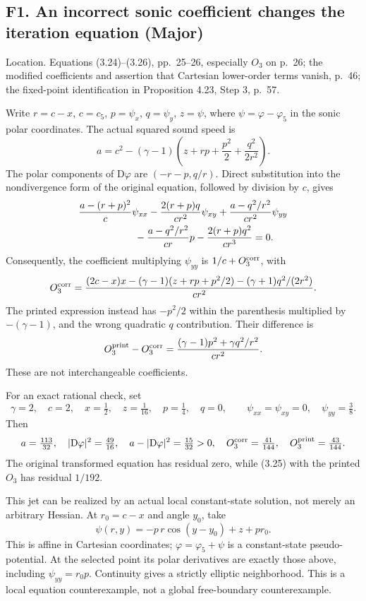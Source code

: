 \documentclass[10pt]{article}
\begin{document}
\subsection*{F1. An incorrect sonic coefficient changes the iteration equation (Major)}
Location. Equations (3.24)–(3.26), pp. 25–26, especially \(O_3\) on p. 26; the modified coefficients and assertion that Cartesian lower-order terms vanish, p. 46; the fixed-point identification in Proposition 4.23, Step 3, p. 57.\par
Write \(r=c-x\), \(c=c_5\), \(p=\psi_x\), \(q=\psi_y\), \(z=\psi\), where \(\psi=\varphi-\varphi_5\) in the sonic polar coordinates. The actual squared sound speed is \[a=c^2-(\gamma-1)
 \left(z+rp+\frac{p^2}{2}+\frac{q^2}{2r^2}\right).\] The polar components of \(\mathrm D\varphi\) are \((-r-p,q/r)\). Direct substitution into the nondivergence form of the original equation, followed by division by \(c\), gives \[\begin{aligned}
 &\frac{a-(r+p)^2}{c}\psi_{xx}
 -\frac{2(r+p)q}{cr^2}\psi_{xy}
 +\frac{a-q^2/r^2}{cr^2}\psi_{yy}\\
 &\hspace{20mm}
 -\frac{a-q^2/r^2}{cr}p
 -\frac{2(r+p)q^2}{cr^3}=0.\end{aligned}\] Consequently, the coefficient multiplying \(\psi_{yy}\) is \(1/c+O_3^{\rm corr}\), with \[O_3^{\rm corr}=
 \frac{(2c-x)x-(\gamma-1)(z+rp+p^2/2)
             -(\gamma+1)q^2/(2r^2)}{cr^2}.\] The printed expression instead has \(-p^2/2\) within the parenthesis multiplied by \(-(\gamma-1)\), and the wrong quadratic \(q\) contribution. Their difference is \[O_3^{\rm print}-O_3^{\rm corr}
   =\frac{(\gamma-1)p^2+\gamma q^2/r^2}{cr^2}.\] These are not interchangeable coefficients.\par
For an exact rational check, set \[\gamma=2,\quad c=2,\quad x=\tfrac12,\quad
 z=\tfrac1{16},\quad p=\tfrac14,\quad q=0,\qquad
 \psi_{xx}=\psi_{xy}=0,\quad\psi_{yy}=\tfrac38.\] Then \[a=\tfrac{113}{32},\quad |\mathrm D\varphi|^2=\tfrac{49}{16},
 \quad a-|\mathrm D\varphi|^2=\tfrac{15}{32}>0,
 \quad O_3^{\rm corr}=\tfrac{41}{144},\quad
 O_3^{\rm print}=\tfrac{43}{144}.\] The original transformed equation has residual zero, while (3.25) with the printed \(O_3\) has residual \(1/192\).\par
This jet can be realized by an actual local constant-state solution, not merely an arbitrary Hessian. At \(r_0=c-x\) and angle \(y_0\), take \[\psi(r,y)=-p\,r\cos(y-y_0)+z+pr_0.\] This is affine in Cartesian coordinates; \(\varphi=\varphi_5+\psi\) is a constant-state pseudo-potential. At the selected point its polar derivatives are exactly those above, including \(\psi_{yy}=r_0p\). Continuity gives a strictly elliptic neighborhood. This is a local equation counterexample, not a global free-boundary counterexample.\par
\end{document}
